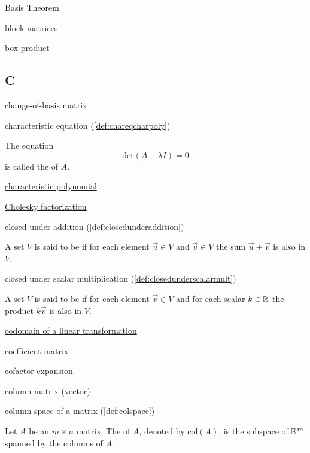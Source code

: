 \documentclass{ximera}
\begin{document}
Basis Theorem

\href{https://ximera.osu.edu/oerlinalg/LinearAlgebra/MAT-0023/main}{block matrices}

\href{https://ximera.osu.edu/oerlinalg/LinearAlgebra/DET-0070/main}{box product}

\subsection{C}

change-of-basis matrix

characteristic equation (\ref{def:chareqcharpoly})
\begin{expandable}
    The equation 
$$\mbox{det}(A-\lambda I) = 0$$ is called the  of $A$. 
\end{expandable}

\href{https://ximera.osu.edu/oerlinalg/LinearAlgebra/EIG-0020/main}{characteristic polynomial}

\href{https://ximera.osu.edu/oerlinalg/LinearAlgebra/RTH-0045/main}{Cholesky factorization}

closed under addition (\ref{def:closedunderaddition})
\begin{expandable}
    A set $V$ is said to be  if for each element $\vec{u} \in V$ and $\vec{v} \in V$ the sum $\vec{u}+\vec{v}$ is also in $V$.
\end{expandable}

closed under scalar multiplication (\ref{def:closedunderscalarmult})
\begin{expandable}
    A set $V$ is said to be  if for each element $\vec{v} \in V$  and for each scalar $k \in \mathbb{R}$ the product $k\vec{v}$ is also in $V$.
\end{expandable}

\href{https://ximera.osu.edu/oerlinalg/LinearAlgebra/LTR-0010/main}{codomain of a linear transformation}

\href{https://ximera.osu.edu/oerlinalg/LinearAlgebra/SYS-0020/main}{coefficient matrix}

\href{https://ximera.osu.edu/oerlinalg/LinearAlgebra/DET-0010/main}{cofactor expansion}


\href{https://ximera.osu.edu/oerlinalg/LinearAlgebra/MAT-0010/main}{column matrix (vector)}

column space of a matrix (\ref{def:colspace})
\begin{expandable}
    Let $A$ be an $m\times n$ matrix.  The  of $A$, denoted by $\mbox{col}(A)$, is the subspace of $\mathbb{R}^m$ spanned by the columns of $A$.
\end{expandable}
\end{document}
